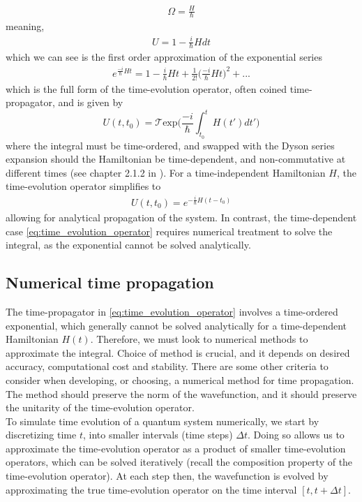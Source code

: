 \documentclass{subfiles}
\begin{document}
\begin{align*}
    \Omega = \frac{H}{\hbar}
\end{align*}
meaning, 
\begin{align*}
    U = 1 - \frac{i}{\hbar}Hdt
\end{align*}
which we can see is the first order approximation of the exponential series
\begin{align*}
    e^{\frac{-i}{\hbar}Ht} = 1 - \frac{i}{\hbar}Ht + \frac{1}{2!}\bigg(\frac{-i}{\hbar}Ht\bigg)^2 + ...
\end{align*}
which is the full form of the time-evolution operator, often coined time-propagator, and is given by
\begin{equation}
    U(t, t_0) = \mathcal{T}\text{exp}\bigg(\frac{-i}{\hbar}\int_{t_0}^t H(t')dt'\bigg)\label{eq:time_evolution_operator}
\end{equation}
where the integral must be time-ordered, and swapped with the Dyson series expansion should the Hamiltonian be time-dependent, and non-commutative at different times (see chapter 2.1.2 in \cite{sakurai1986modern}). For a time-independent Hamiltonian $H$, the time-evolution operator simplifies to 
\begin{align*}
    U(t, t_0) = e^{-\frac{i}{\hbar}H(t-t_0)}
\end{align*}
allowing for analytical propagation of the system. In contrast, the time-dependent case \eqref{eq:time_evolution_operator} requires numerical treatment to solve the integral, as the exponential cannot be solved analytically. 

\subsection{Numerical time propagation}
The time-propagator in \eqref{eq:time_evolution_operator} involves a time-ordered exponential, which generally cannot be solved analytically for a time-dependent Hamiltonian $H(t)$. Therefore, we must look to numerical methods to approximate the integral. Choice of method is crucial, and it depends on desired accuracy, computational cost and stability. There are some other criteria to consider when developing, or choosing, a numerical method for time propagation. The method should preserve the norm of the wavefunction, and it should preserve the unitarity of the time-evolution operator. 
\\

To simulate time evolution of a quantum system numerically, we start by discretizing time $t$, into smaller intervals (time steps) $\Delta t$. Doing so allows us to approximate the time-evolution operator as a product of smaller time-evolution operators, which can be solved iteratively (recall the composition property of the time-evolution operator). At each step then, the wavefunction is evolved by approximating the true time-evolution operator on the time interval $[t, t+\Delta t]$. \\ 
\end{document}
